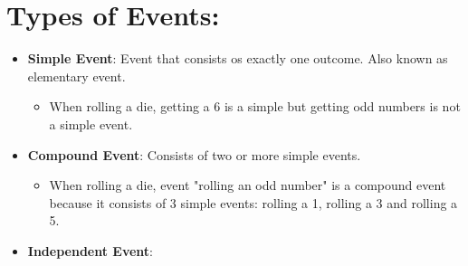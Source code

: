 \documentclass{article}
\begin{document}
\section*{Types of Events:}
\begin{itemize}
    \item \textbf{Simple Event}: Event that consists os exactly one outcome. Also known as elementary event.
    \begin{itemize}
        \item When rolling a die, getting a 6 is a simple but getting odd numbers is not a simple event.
    \end{itemize}
    \item \textbf{Compound Event}: Consists of two or more simple events. 
    \begin{itemize}
        \item When rolling a die, event "rolling an odd number" is a compound event because it consists of 3 simple events: rolling a 1, rolling a 3 and rolling a 5.
    \end{itemize}
    \item \textbf{Independent Event}: 
\end{itemize}
\end{document}
